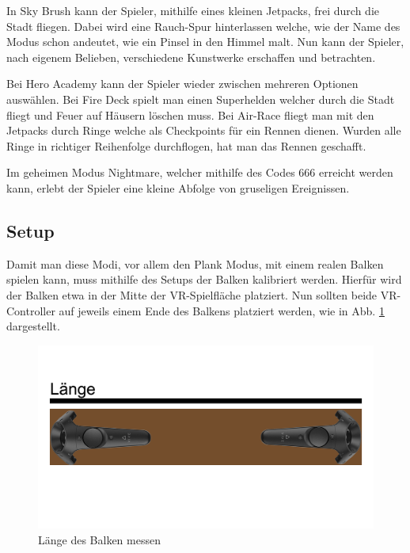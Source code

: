 In Sky Brush kann der Spieler, mithilfe eines kleinen Jetpacks, frei durch die Stadt fliegen.
Dabei wird eine Rauch-Spur hinterlassen welche, wie der Name des Modus schon andeutet, wie ein Pinsel in den Himmel malt.
Nun kann der Spieler, nach eigenem Belieben, verschiedene Kunstwerke erschaffen und betrachten.
~\cite{ToastGames_2021_Steam}

Bei Hero Academy kann der Spieler wieder zwischen mehreren Optionen auswählen.
Bei Fire Deck spielt man einen Superhelden welcher durch die Stadt fliegt und Feuer auf Häusern löschen muss.
Bei Air-Race fliegt man mit den Jetpacks durch Ringe welche als Checkpoints für ein Rennen dienen.
Wurden alle Ringe in richtiger Reihenfolge durchflogen, hat man das Rennen geschafft.
~\cite{ToastGames_2021_Steam}

Im geheimen Modus Nightmare, welcher mithilfe des Codes 666 erreicht werden kann, erlebt der Spieler eine kleine Abfolge von gruseligen Ereignissen.
~\cite{ToastGames_2021_VivePort}

\subsection{Setup}
\label{sec:richiesplankexperience_setup}

Damit man diese Modi, vor allem den Plank Modus, mit einem realen Balken spielen kann, muss mithilfe des Setups der Balken kalibriert werden.
Hierfür wird der Balken etwa in der Mitte der VR-Spielfläche platziert.
Nun sollten beide VR-Controller auf jeweils einem Ende des Balkens platziert werden, wie in Abb. \ref{fig:beam_length_measurement} dargestellt.

\begin {figure}
    \includegraphics[scale=0.18]{pics/beam_length_measurement}
    \caption{L\"ange des Balken messen}
    \label{fig:beam_length_measurement}
\end {figure}

